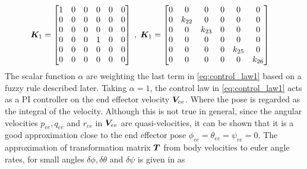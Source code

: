 \begin{align}
	\boldsymbol K_{1} =\left[\begin{matrix}{}1 & 0 & 0 & 0 & 0 & 0\\0 & 0 & 0 & 0 & 0 & 0\\0 & 0 & 0 & 0 & 0 & 0\\0 & 0 & 0 & 1 & 0 & 0\\0 & 0 & 0 & 0 & 0 & 0\\0 & 0 & 0 & 0 & 0 & 0\end{matrix}\right]
	\label{eq:k1k2} \; , \; 
\boldsymbol K_{1} &=
\left[\begin{matrix}{}0 & 0 & 0 & 0 & 0 & 0\\0 & k_{22} & 0 & 0 & 0 & 0\\0 & 0 & k_{23} & 0 & 0 & 0\\0 & 0 & 0 & 0 & 0 & 0\\0 & 0 & 0 & 0 & k_{25} & 0\\0 & 0 & 0 & 0 & 0 & k_{26}\end{matrix}\right]
\end{align}
The scalar function $\alpha$ are weighting the last term in \eqref{eq:control_law1} based on a fuzzy rule described later. Taking $\alpha = 1$, the control law in \eqref{eq:control_law1} acts as a PI controller on the end effector velocity $\boldsymbol V_{ee}$. Where the pose is regarded as the integral of the velocity. Although this is not true in general, since the angular velocities $p_{ee}, q_{ee}$ and $r_{ee}$ in  $\boldsymbol V_{ee}$ are quasi-velocities, it can be shown that it is a good approximation close to the end effector pose $\phi_{ee} = \theta_{ee}=\psi_{ee}=0$. The approximation of transformation matrix $\boldsymbol T$ from body velocities to euler angle rates, for small angles $\delta \phi, \delta \theta$ and $\delta \psi$ is given in \cite{fs} as

